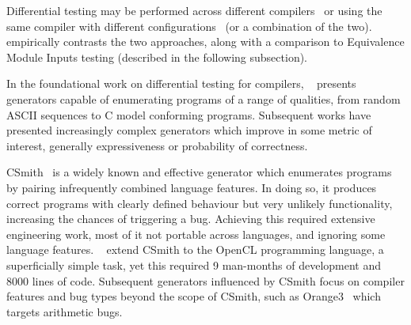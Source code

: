 Differential testing may be performed across different compilers~\cite{Chen2016b,Lidbury2015a} or using the same compiler with different configurations~\cite{Kyle2015b,Paka2011} (or a combination of the two). \citeauthor{Chen2014a}~\cite{Chen2014a} empirically contrasts the two approaches, along with a comparison to Equivalence Module Inputs testing (described in the following subsection).

In the foundational work on differential testing for compilers, \citeauthor{McKeeman1998}~\cite{McKeeman1998} presents generators capable of enumerating programs of a range of qualities, from random ASCII sequences to C model conforming programs. Subsequent works have presented increasingly complex generators which improve in some metric of interest, generally expressiveness or probability of correctness.

CSmith~\cite{Yang2011} is a widely known and effective generator which enumerates programs by pairing infrequently combined language features. In doing so, it produces correct programs with clearly defined behaviour but very unlikely functionality, increasing the chances of triggering a bug. Achieving this required extensive engineering work, most of it not portable across languages, and ignoring some language features.
\citeauthor{Lidbury2015a}~\cite{Lidbury2015a} extend CSmith to the OpenCL programming language, a superficially simple task, yet this required 9 man-months of development and 8000 lines of code.
Subsequent generators influenced by CSmith focus on compiler features and bug types beyond the scope of CSmith, such as Orange3~\cite{Nagai2013} which targets arithmetic bugs.


